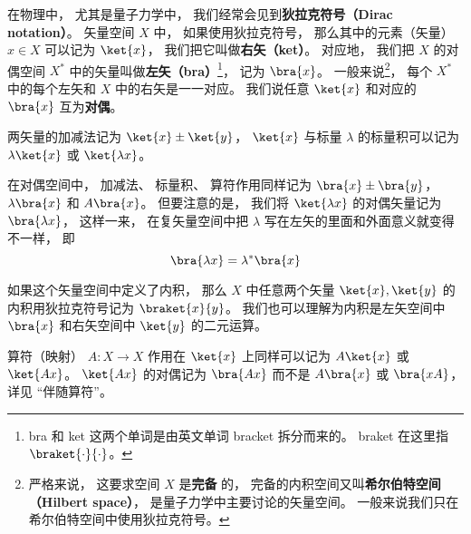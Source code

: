 

在物理中， 尤其是量子力学中， 我们经常会见到\textbf{狄拉克符号（Dirac notation）}。 矢量空间 $X$ 中， 如果使用狄拉克符号， 那么其中的元素（矢量） $x\in X$ 可以记为 $\ket{x}$， 我们把它叫做\textbf{右矢（ket）}。 对应地， 我们把 $X$ 的对偶空间 $X^*$ 中的矢量叫做\textbf{左矢（bra）}\footnote{bra 和 ket 这两个单词是由英文单词 bracket 拆分而来的。 braket 在这里指 $\braket{\cdot}{\cdot}$。}， 记为 $\bra{x}$。 一般来说\footnote{严格来说， 这要求空间 $X$ 是\textbf{完备}%
的， 完备的内积空间又叫\textbf{希尔伯特空间（Hilbert space）}， 是量子力学中主要讨论的矢量空间。 一般来说我们只在希尔伯特空间中使用狄拉克符号。}， 每个 $X^*$ 中的每个左矢和 $X$ 中的右矢是一一对应。 我们说任意 $\ket{x}$ 和对应的 $\bra{x}$ 互为\textbf{对偶}。

两矢量的加减法记为 $\ket{x} \pm \ket{y}$， $\ket{x}$ 与标量 $\lambda$ 的标量积可以记为 $\lambda\ket{x}$ 或 $\ket{\lambda x}$。

在对偶空间中， 加减法、 标量积、 算符作用同样记为 $\bra{x} \pm \bra{y}$， $\lambda\bra{x}$ 和 $A\bra{x}$。 但要注意的是， 我们将 $\ket{\lambda x}$ 的对偶矢量记为 $\bra{\lambda x}$， 这样一来， 在复矢量空间中把 $\lambda$ 写在左矢的里面和外面意义就变得不一样， 即 %
\begin{equation}
\bra{\lambda x} = \lambda^* \bra{x}
\end{equation}

如果这个矢量空间中定义了内积， 那么 $X$ 中任意两个矢量 $\ket{x}, \ket{y}$ 的内积用狄拉克符号记为 $\braket{x}{y}$。 我们也可以理解为内积是左矢空间中 $\bra{x}$ 和右矢空间中 $\ket{y}$ 的二元运算。

算符（映射） $A:X\to X$ 作用在 $\ket{x}$ 上同样可以记为 $A\ket{x}$ 或 $\ket{Ax}$。 $\ket{Ax}$ 的对偶记为 $\bra{Ax}$ 而不是 $A\bra{x}$ 或 $\bra{xA}$， 详见 “伴随算符”。
